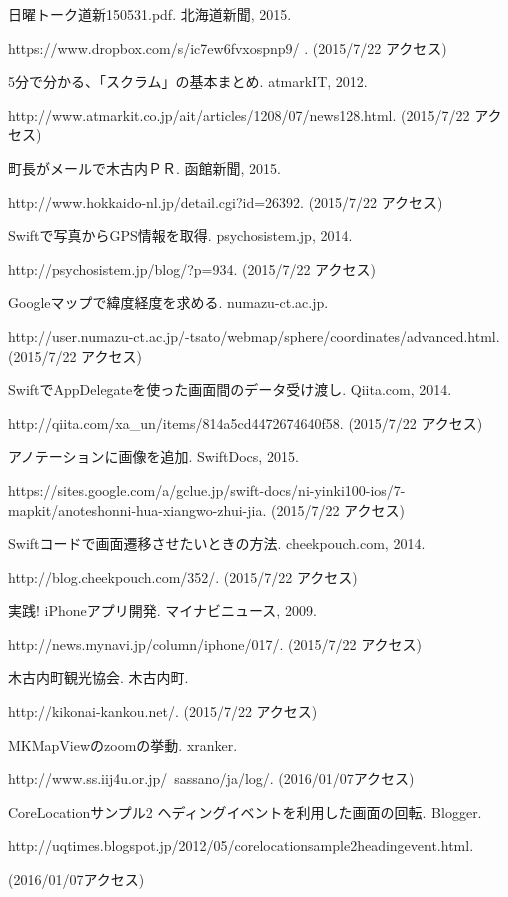 \documentclass[openany,11pt,papersize]{jsbook}
\begin{document}
\begin{thebibliography}{9}
日曜トーク道新150531.pdf. 北海道新聞, 2015.\par
https://www.dropbox.com/s/ic7ew6fvxospnp9/%
. (2015/7/22 アクセス)

5分で分かる、「スクラム」の基本まとめ. atmarkIT, 2012.\par
http://www.atmarkit.co.jp/ait/articles/1208/07/news128.html. (2015/7/22 アクセス)

町長がメールで木古内ＰＲ. 函館新聞, 2015.\par
http://www.hokkaido-nl.jp/detail.cgi?id=26392. (2015/7/22 アクセス)

Swiftで写真からGPS情報を取得. psychosistem.jp, 2014.\par
http://psychosistem.jp/blog/?p=934. (2015/7/22 アクセス)

\bibitem{}
Googleマップで緯度経度を求める. numazu-ct.ac.jp.\par
http://user.numazu-ct.ac.jp/-tsato/webmap/sphere/coordinates/advanced.html. (2015/7/22 アクセス)

\bibitem{}
SwiftでAppDelegateを使った画面間のデータ受け渡し. Qiita.com, 2014.\par 
http://qiita.com/xa\_un/items/814a5cd4472674640f58. (2015/7/22 アクセス)

\bibitem{}
アノテーションに画像を追加. SwiftDocs, 2015. \par
https://sites.google.com/a/gclue.jp/swift-docs/ni-yinki100-ios/7-mapkit/anoteshonni-hua-xiangwo-zhui-jia. (2015/7/22 アクセス)

\bibitem{}
Swiftコードで画面遷移させたいときの方法. cheekpouch.com, 2014.\par
http://blog.cheekpouch.com/352/. (2015/7/22 アクセス)

\bibitem{}
実践! iPhoneアプリ開発. マイナビニュース, 2009.\par
http://news.mynavi.jp/column/iphone/017/. (2015/7/22 アクセス)

\bibitem{}
木古内町観光協会. 木古内町.\par
http://kikonai-kankou.net/. (2015/7/22 アクセス)

\bibitem{}
MKMapViewのzoomの挙動. xranker. \par
http://www.ss.iij4u.or.jp/~sassano/ja/log/. (2016/01/07アクセス)

\bibitem{}
CoreLocationサンプル2 ヘディングイベントを利用した画面の回転. Blogger. \par
http://uqtimes.blogspot.jp/2012/05/corelocationsample2headingevent.html. \par
(2016/01/07アクセス)


\end{thebibliography}
\end{document}
